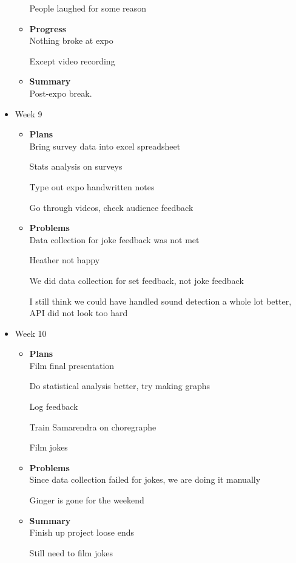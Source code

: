\begin{itemize}
\begin{itemize}
People laughed for some reason
			\item \textbf{Progress} \\
			Nothing broke at expo

Except video recording
			\item \textbf{Summary} \\
			Post-expo break.
		\end{itemize}
		\item{Week 9}
		\begin{itemize}
			\item \textbf{Plans} \\
			Bring survey data into excel spreadsheet

Stats analysis on surveys

Type out expo handwritten notes

Go through videos, check audience feedback
			\item \textbf{Problems} \\
			Data collection for joke feedback was not met

Heather not happy

We did data collection for set feedback, not joke feedback

I still think we could have handled sound detection a whole lot better, API did not look too hard
		\end{itemize}
		\item{Week 10}
		\begin{itemize}
			\item \textbf{Plans} \\
			Film final presentation

Do statistical analysis better, try making graphs

Log feedback

Train Samarendra on choregraphe

Film jokes
			\item \textbf{Problems} \\
			Since data collection failed for jokes, we are doing it manually

Ginger is gone for the weekend
			\item \textbf{Summary} \\

Finish up project loose ends

Still need to film jokes
		\end{itemize}
	\end{itemize}
